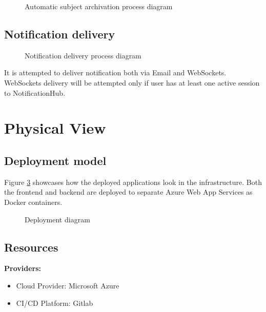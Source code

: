 \documentclass[
    english, %
]{VUMIFPSkursinis}
\begin{document}
\begin{figure}[ht]
    \centering
    
    \caption{Automatic subject archivation process diagram}
    \label{automatic-archivation-process}
\end{figure}

\subsection{Notification delivery}

\begin{figure}[ht]
    \centering
    
    \caption{Notification delivery process diagram}
    \label{notification-process}
\end{figure}

It is attempted to deliver notification both via Email and WebSockets. WebSockets delivery will be attempted only if user has at least one active session to NotificationHub.

\section{Physical View}

\subsection{Deployment model}

Figure \ref{deployment-diagram} showcases how the deployed applications look in the infrastructure. Both the frontend and backend are deployed to separate Azure Web App Services as Docker containers.

\begin{figure}[ht]
    \centering
    
    \caption{Deployment diagram}
    \label{deployment-diagram}
\end{figure}

\subsection{Resources}

\textbf{Providers:}
\begin{itemize}
    \item Cloud Provider: Microsoft Azure
    \item CI/CD Platform: Gitlab
\end{itemize}
\end{document}
